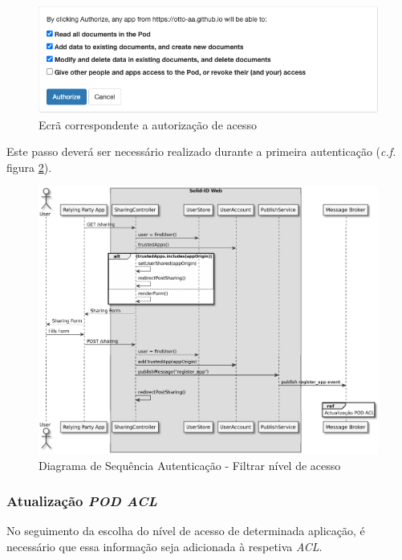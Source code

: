 \begin{figure}[H]
    \begin{center}
    \includegraphics[width=0.9 \textwidth]{figures/solid_filter_app_access.png}
    \caption{Ecrã correspondente a autorização de acesso}
            \label{figure_filter_app_access}
    \end{center}
\end{figure}

Este passo deverá ser necessário realizado durante a primeira autenticação (\emph{c.f.} figura \ref{autenticacao_sd2}).

\begin{figure}[H]
    \begin{center}
    \includegraphics[width=1 \textwidth]{figures/authentication_sd_2.eps}
    \caption{Diagrama de Sequência Autenticação - Filtrar nível de acesso}
            \label{autenticacao_sd2}
    \end{center}
\end{figure}

\subsubsection{Atualização \emph{\acrshort{POD} \acrshort{ACL}}}
No seguimento da escolha do nível de acesso de determinada aplicação, é necessário que essa informação seja adicionada à respetiva \emph{\acrshort{ACL}}.


